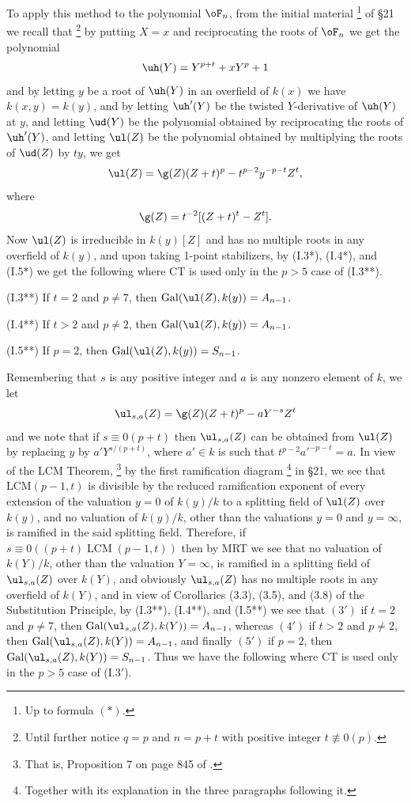 To apply this method to the polynomial $\oF_n$, from the 
initial material 
\footnote{Up to formula $(\ast)$.}
of \S21 we recall that
\footnote{Until further notice 
$q=p$ and $n=p+t$ with positive integer $t\not\equiv 0(p)$.}
by putting $X=x$ and reciprocating 
the roots of $\oF_n$ we get the polynomial
$$
\uh(Y)=Y^{p+t}+xY^p+1
$$
and by letting $y$ be a root of $\uh(Y)$ in an overfield 
of $k(x)$ we have
$k(x,y)=k(y)$, and by letting $\uh'(Y)$ be the twisted 
$Y$-derivative of 
$\uh(Y)$ at $y$, and letting $\ud(Y)$ be the polynomial 
obtained by 
reciprocating the roots of $\uh'(Y)$, and letting $\ul(Z)$ 
be the polynomial 
obtained by multiplying the roots of $\ud(Z)$ by $ty$, we 
get
$$
\ul(Z)=\g(Z)(Z+t)^p-t^{p-2}y^{-p-t}Z^t,
$$
where
$$
\g(Z)=t^{-2}[(Z+t)^t-Z^t].
$$
Now $\ul(Z)$ is irreducible in $k(y)[Z]$ and has no 
multiple roots in
any overfield of $k(y)$, and upon taking 1-point 
stabilizers, by
(I.3*), (I.4*), and (I.5*) we get the following where CT 
is used only in
the $p>5$ case of (I.3**).

(I.3**) If $t=2$ and $p\ne 7$, then 
$\operatorname{Gal}(\ul(Z),k(y))=A_{n-1}$.

(I.4**) If $t>2$ and $p\ne 2$, then 
$\operatorname{Gal}(\ul(Z),k(y))=A_{n-1}$.

(I.5**) If $p=2$, then 
$\operatorname{Gal}(\ul(Z),k(y))=S_{n-1}$.

Remembering that $s$ is any positive integer and $a$ is 
any nonzero element 
of $k$, we let
$$
\ul_{s,a}(Z)=\g(Z)(Z+t)^p-aY^{-s}Z^t
$$
and we note that if $s\equiv 0(p+t)$ then $\ul_{s,a}(Z)$ 
can be obtained 
from $\ul(Z)$ by replacing $y$ by $a'Y^{s/(p+t)}$, where 
$a'\in k$ is 
such that $t^{p-2}a\prime^{-p-t}=a$. In view of the LCM Theorem,
\footnote{That is, Proposition 7 on page 845 of \cite{A3}.}
by the first ramification diagram 
\footnote{Together with its explanation in the three 
paragraphs following it.}
in \S21, we see that LCM$(p-1,t)$ is divisible by the 
reduced ramification exponent of every extension
of the valuation $y=0$ of $k(y)/k$ to a splitting field of 
$\ul(Z)$ over
$k(y)$, and no valuation of $k(y)/k$, other than the 
valuations
$y=0$ and $y=\infty$, is ramified in the said splitting 
field. Therefore,
if $s\equiv 0((p+t)\operatorname{LCM}(p-1,t))$ then 
by MRT we see that no valuation
of $k(Y)/k$, other than the valuation $Y=\infty$, is 
ramified in a splitting
field of $\ul_{s,a}(Z)$ over $k(Y)$, and obviously 
$\ul_{s,a}(Z)$ 
has no multiple roots in any overfield of $k(Y)$, and in 
view
of Corollaries (3.3), (3.5), and (3.8) of the Substitution 
Principle, by 
(I.3**), (I.4**), and (I.5**) we see that $(3')$ if $t=2$ 
and $p\ne 7$, then 
$\operatorname{Gal}(\ul_{s,a}(Z),k(Y))=A_{n-1}$, whereas 
$(4')$ if $t>2$ and
$p\ne 2$, then 
$\operatorname{Gal}(\ul_{s,a}(Z),k(Y))=A_{n-1}$, and 
finally $(5')$ if
$p=2$, then 
$\operatorname{Gal}(\ul_{s,a}(Z),k(Y))=S_{n-1}$. Thus we 
have the following
where CT is used only in the $p>5$ case of (I.$3'$).

